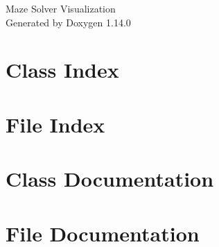 \documentclass[twoside]{book}
\newcommand{\+}{\discretionary{\mbox{\scriptsize$\hookleftarrow$}}{}{}}
\newcommand{\clearemptydoublepage}{%
    \newpage{\pagestyle{empty}\cleardoublepage}%
  }
\begin{document}
  \raggedbottom
    \hypersetup{pageanchor=false,
                bookmarksnumbered=true,
                pdfencoding=unicode
               }
  \begin{titlepage}
  \vspace*{7cm}
  \begin{center}%
  {\Large Maze Solver Visualization}\\
  \vspace*{1cm}
  {\large Generated by Doxygen 1.14.0}\\
  \end{center}
  \end{titlepage}
  \clearemptydoublepage
  \tableofcontents
  \clearemptydoublepage
  \hypersetup{pageanchor=true}

\chapter{Class Index}

\chapter{File Index}

\chapter{Class Documentation}



\chapter{File Documentation}




  \backmatter
  \newpage
  \clearemptydoublepage
  \printindex
\end{document}
